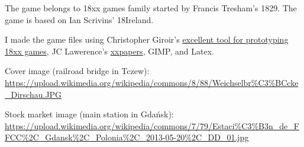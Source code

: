 \documentclass[10pt,a4paper,twocolumn]{article}
\begin{document}
The game belongs to 18xx games family started by Francis Tresham's 1829. The game is based on Ian Scrivins' 18Ireland.

I made the game files using Christopher Giroir's \href{https://github.com/kelsin/18xx}{excellent tool for prototyping 18xx games}, JC Lawerence's \href{https://github.com/clearclaw/xxpaper}{xxpapers}, GIMP, and Latex.

Cover image (railroad bridge in Tczew): \url{https://upload.wikimedia.org/wikipedia/commons/8/88/Weichselbr\%C3\%BCcke_Dirschau.JPG}

Stock market image (main station in Gdańsk): \url{https://upload.wikimedia.org/wikipedia/commons/7/79/Estaci\%C3\%B3n_de_FFCC\%2C_Gdansk\%2C_Polonia\%2C_2013-05-20\%2C_DD_01.jpg}

\end{document}
